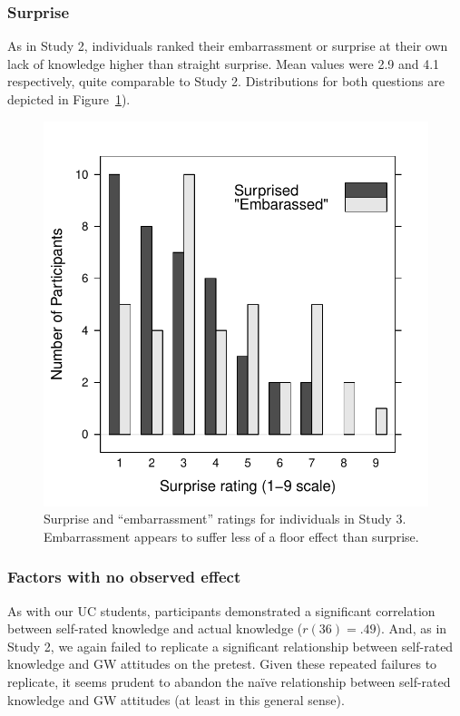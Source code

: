 \subsubsection{Surprise}

As in Study 2, individuals ranked their embarrassment or surprise at their own
lack of knowledge higher than straight surprise. Mean values were 2.9 and 4.1
respectively, quite comparable to Study 2. Distributions for both questions are
depicted in Figure~\ref{fig:CCO-mech-surprise}). 

\begin{figure}
    \centering
    \includegraphics{CCO-mech-surprise-by-question.pdf}
    \caption{Surprise and “embarrassment” ratings for individuals in Study 3.
        Embarrassment appears to suffer less of a floor effect than surprise.}
    \label{fig:CCO-mech-surprise}
\end{figure}


\subsubsection{Factors with no observed effect}

As with our UC students, participants demonstrated a significant correlation
between self-rated knowledge and actual knowledge ($r(36)=.49$).  And, as in
Study 2, we again failed to replicate a significant relationship between
self-rated knowledge and GW attitudes on the pretest. Given these repeated
failures to replicate, it seems prudent to abandon the naïve relationship
between self-rated knowledge and GW attitudes (at least in this general sense).

